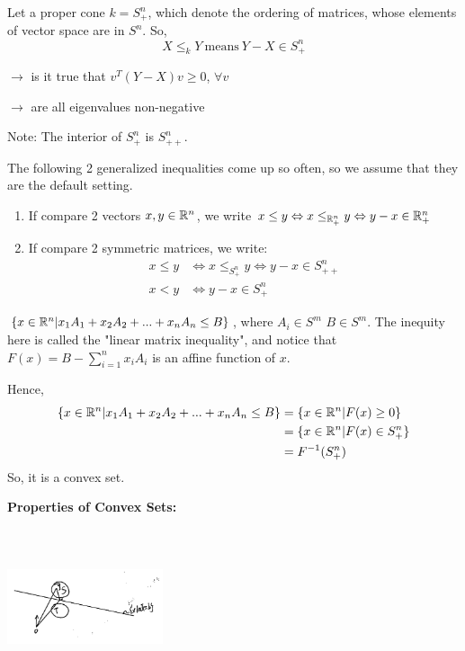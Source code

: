 \begin{example}
	Let a proper cone $k = S^n_+$, which denote the ordering of matrices, whose elements of vector space are in $S^n$. So,
	$$X\leq_k Y\ \text{means}\ Y-X\in S^n_+$$
	
	$\rightarrow$ is it true that $v^T(Y-X)v \geq 0$, $\forall v$
	
	$\rightarrow$ are all eigenvalues non-negative
	
	Note: The interior of $S_+^n$ is $S^n_{++}$.
	
\end{example}

\vspace{0.3cm}
The following 2 generalized inequalities come up so often, so we assume that they are the default setting.
\begin{enumerate}
	\item If compare 2 vectors $x,y\in \mathbb{R}^n$, we write $x\leq  y\Leftrightarrow x\leq_{\mathbb{R}^n_{+}}y \Leftrightarrow y-x\in \mathbb{R}^n_{+}$ 
	
	\item If compare 2 symmetric matrices, we write:
	\begin{align*}
	x\leq y &\Leftrightarrow x\leq_{S_+^n} y\Leftrightarrow y - x\in S^n_{++}\\
	x< y &\Leftrightarrow y - x\in S^n_{+}
	\end{align*}
\end{enumerate}

\begin{example}
$\{x\in \mathbb{R}^n | x_1A_1 + x_2A_2 + ... + x_nA_n \leq B\}$, where $A_i\in S^m$ $B\in S^m$. The inequity here is called the "linear matrix inequality", and notice that $F(x) = B - \sum^n_{i=1}x_iA_i$ is an affine function of $x$. 

Hence,
\begin{align*}
\{x\in \mathbb{R}^n | x_1A_1 + x_2A_2 + ... + x_nA_n \leq B\}
 &= \{x\in \mathbb{R}^n | F(x)\geq 0\}\\
 &= \{x\in \mathbb{R}^n | F(x)\in S^n_+ \}\\
 &=F^{-1}(S^n_+)
\end{align*}
So, it is a convex set.\\
\end{example}

\vspace{0.5cm}
\textbf{Properties of Convex Sets:}
\begin{marginfigure}
	\centering
	\includegraphics[width=1.8in,height=1.8in]{figures/ch08/figure1030_2.png}
\end{marginfigure}


